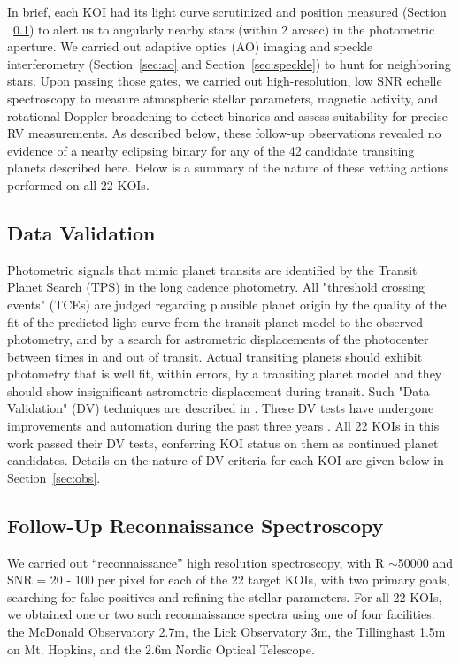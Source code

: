 \documentclass{emulateapj}
\begin{document}
In brief, each KOI had its light curve scrutinized and position
measured (Section ~\ref{sec:dv}) to alert us to angularly nearby stars (within 2
arcsec) in the photometric aperture. We carried out adaptive optics
(AO) imaging and speckle interferometry (Section~\ref{sec:ao} and
Section~\ref{sec:speckle}) to hunt for neighboring stars.  Upon
passing those gates, we carried out high-resolution, low SNR echelle
spectroscopy to measure atmospheric stellar parameters, magnetic
activity, and rotational Doppler broadening to detect binaries and
assess suitability for precise RV measurements.  As described below,
these follow-up observations revealed no evidence of a nearby
eclipsing binary for any of the 42 candidate transiting planets
described here.  Below is a summary of the nature of these vetting
actions performed on all 22 KOIs.


\subsection{Data Validation}
\label{sec:dv}

Photometric signals that mimic planet transits are identified by the
\ek Transit Planet Search (TPS) in the long cadence photometry.  All
"threshold crossing events" (TCEs) are judged regarding plausible
planet origin by the quality of the fit of the predicted light curve
from the transit-planet model to the observed photometry, and by a
search for astrometric displacements of the photocenter between times
in and out of transit.  Actual transiting planets should exhibit
photometry that is well fit, within errors, by a transiting planet
model and they should show insignificant astrometric displacement
during transit.  Such "Data Validation" (DV) techniques are described
in \cite{Batalha_fp, Batalha2011, Bryson2013}.  These DV tests have
undergone improvements and automation during the past three years
\cite{dv, Bryson2013}. All 22 KOIs in this work passed their DV tests,
conferring KOI status on them as continued planet candidates.  Details
on the nature of DV criteria for each KOI are given below in
Section~\ref{sec:obs}.


\subsection{Follow-Up Reconnaissance Spectroscopy}
\label{sec:recon}

We carried out ``reconnaissance'' high resolution spectroscopy, with R
$\sim$50000 and SNR = 20 - 100 per pixel for each of the 22 target
KOIs, with two primary goals, searching for false positives and
refining the stellar parameters.  For all 22 KOIs, we obtained one or
two such reconnaissance spectra using one of four facilities: the
McDonald Observatory 2.7m, the Lick Observatory 3m, the Tillinghast
1.5m on Mt. Hopkins, and the 2.6m Nordic Optical Telescope.
 
\end{document}
